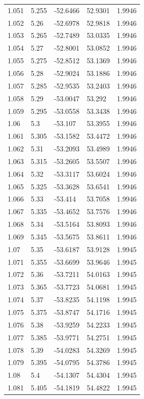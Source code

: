 \begin{tabular}{lllll}
1.051 & 5.255 & -52.6466 & 52.9301 & 1.9946 \\
1.052 & 5.26 & -52.6978 & 52.9818 & 1.9946 \\
1.053 & 5.265 & -52.7489 & 53.0335 & 1.9946 \\
1.054 & 5.27 & -52.8001 & 53.0852 & 1.9946 \\
1.055 & 5.275 & -52.8512 & 53.1369 & 1.9946 \\
1.056 & 5.28 & -52.9024 & 53.1886 & 1.9946 \\
1.057 & 5.285 & -52.9535 & 53.2403 & 1.9946 \\
1.058 & 5.29 & -53.0047 & 53.292 & 1.9946 \\
1.059 & 5.295 & -53.0558 & 53.3438 & 1.9946 \\
1.06 & 5.3 & -53.107 & 53.3955 & 1.9946 \\
1.061 & 5.305 & -53.1582 & 53.4472 & 1.9946 \\
1.062 & 5.31 & -53.2093 & 53.4989 & 1.9946 \\
1.063 & 5.315 & -53.2605 & 53.5507 & 1.9946 \\
1.064 & 5.32 & -53.3117 & 53.6024 & 1.9946 \\
1.065 & 5.325 & -53.3628 & 53.6541 & 1.9946 \\
1.066 & 5.33 & -53.414 & 53.7058 & 1.9946 \\
1.067 & 5.335 & -53.4652 & 53.7576 & 1.9946 \\
1.068 & 5.34 & -53.5164 & 53.8093 & 1.9946 \\
1.069 & 5.345 & -53.5675 & 53.8611 & 1.9946 \\
1.07 & 5.35 & -53.6187 & 53.9128 & 1.9945 \\
1.071 & 5.355 & -53.6699 & 53.9646 & 1.9945 \\
1.072 & 5.36 & -53.7211 & 54.0163 & 1.9945 \\
1.073 & 5.365 & -53.7723 & 54.0681 & 1.9945 \\
1.074 & 5.37 & -53.8235 & 54.1198 & 1.9945 \\
1.075 & 5.375 & -53.8747 & 54.1716 & 1.9945 \\
1.076 & 5.38 & -53.9259 & 54.2233 & 1.9945 \\
1.077 & 5.385 & -53.9771 & 54.2751 & 1.9945 \\
1.078 & 5.39 & -54.0283 & 54.3269 & 1.9945 \\
1.079 & 5.395 & -54.0795 & 54.3786 & 1.9945 \\
1.08 & 5.4 & -54.1307 & 54.4304 & 1.9945 \\
1.081 & 5.405 & -54.1819 & 54.4822 & 1.9945 \\

\end{tabular}
